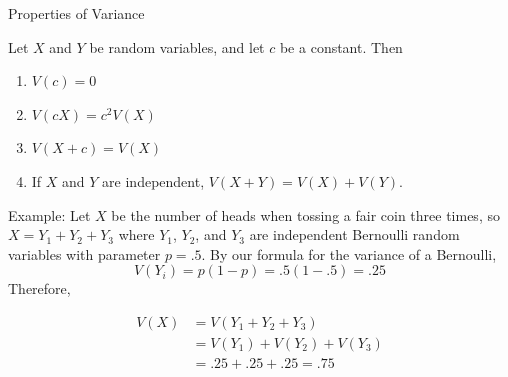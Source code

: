 \documentclass[xcolor=table]{beamer}
\begin{document}
\begin{frame}{Properties of Variance}
\begin{block}{}
Let $X$ and $Y$ be random variables, and let $c$ be a constant. Then
\begin{enumerate}
\item $V(c) = 0$
\item $V(cX) = c^2V(X)$
\item $V(X+c) = V(X)$
\item If $X$ and $Y$ are independent, $V(X+Y)=V(X)+V(Y)$.
\end{enumerate}
\end{block}

\pause Example: Let $X$ be the number of heads when tossing a fair coin three times, so $X=Y_1+Y_2+Y_3$ where $Y_1$, $Y_2$, and $Y_3$ are independent Bernoulli random variables with parameter $p=.5$. By our formula for the variance of a Bernoulli,
$$V(Y_i)=p(1-p)=.5(1-.5)=.25$$
\pause Therefore,

\vspace{-.8cm}
\begin{align*}
V(X)&=V(Y_1+Y_2+Y_3)\\
&=V(Y_1)+V(Y_2)+V(Y_3)\\
&=.25+.25+.25=.75
\end{align*}
\end{frame}


%
\end{document}
